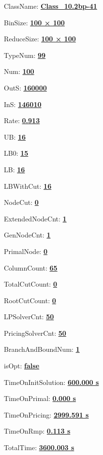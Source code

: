 \documentclass[11pt]{article}
\begin{document}
\pagestyle{empty}


ClassName: \underline{\textbf{Class_10.2bp-41}}
\par
BinSize: \underline{\textbf{100 × 100}}
\par
ReduceSize: \underline{\textbf{100 × 100}}
\par
TypeNum: \underline{\textbf{99}}
\par
Num: \underline{\textbf{100}}
\par
OutS: \underline{\textbf{160000}}
\par
InS: \underline{\textbf{146010}}
\par
Rate: \underline{\textbf{0.913}}
\par
UB: \underline{\textbf{16}}
\par
LB0: \underline{\textbf{15}}
\par
LB: \underline{\textbf{16}}
\par
LBWithCut: \underline{\textbf{16}}
\par
NodeCut: \underline{\textbf{0}}
\par
ExtendedNodeCnt: \underline{\textbf{1}}
\par
GenNodeCnt: \underline{\textbf{1}}
\par
PrimalNode: \underline{\textbf{0}}
\par
ColumnCount: \underline{\textbf{65}}
\par
TotalCutCount: \underline{\textbf{0}}
\par
RootCutCount: \underline{\textbf{0}}
\par
LPSolverCnt: \underline{\textbf{50}}
\par
PricingSolverCnt: \underline{\textbf{50}}
\par
BranchAndBoundNum: \underline{\textbf{1}}
\par
isOpt: \underline{\textbf{false}}
\par
TimeOnInitSolution: \underline{\textbf{600.000 s}}
\par
TimeOnPrimal: \underline{\textbf{0.000 s}}
\par
TimeOnPricing: \underline{\textbf{2999.591 s}}
\par
TimeOnRmp: \underline{\textbf{0.113 s}}
\par
TotalTime: \underline{\textbf{3600.003 s}}
\par
\newpage


\end{document}
